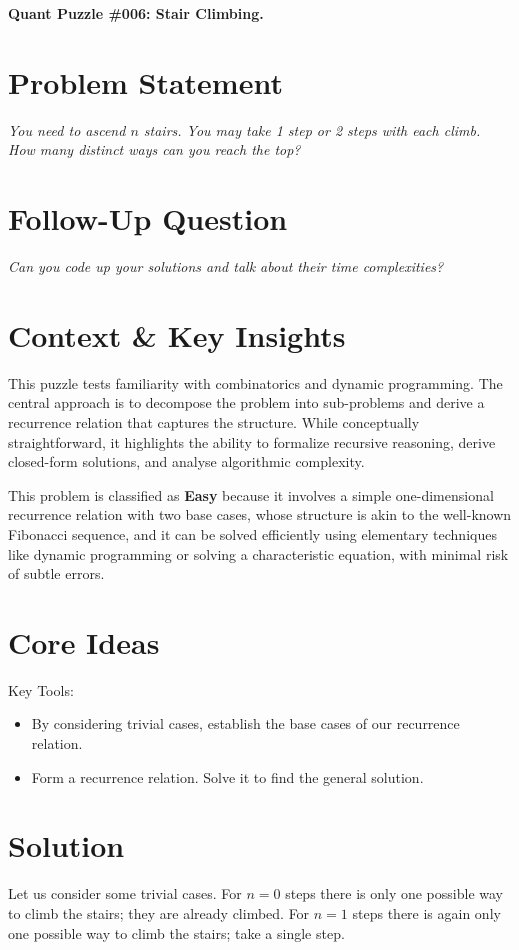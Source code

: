 \documentclass[12pt]{article}
\begin{document}
\begin{center}
    \Large \textbf{Quant Puzzle \#006: Stair Climbing.}
\end{center}

\section*{Problem Statement}
\textit{You need to ascend $n$ stairs. You may take 1 step or 2 steps with each climb. How many distinct ways can you reach the top?}
\section*{Follow-Up Question}
\textit{Can you code up your solutions and talk about their time complexities?}

\bigskip

\section*{Context \& Key Insights}
This puzzle tests familiarity with combinatorics and dynamic programming. The central approach is to decompose the problem into sub-problems and derive a recurrence relation that captures the structure. While conceptually straightforward, it highlights the ability to formalize recursive reasoning, derive closed-form solutions, and analyse algorithmic complexity.

This problem is classified as \textbf{Easy} because it involves a simple one-dimensional recurrence relation with two base cases, whose structure is akin to the well-known Fibonacci sequence, and it can be solved efficiently using elementary techniques like dynamic programming or solving a characteristic equation, with minimal risk of subtle errors.

\section*{Core Ideas}
Key Tools:
\begin{itemize}
    \item By considering trivial cases, establish the base cases of our recurrence relation.
    \item Form a recurrence relation. Solve it to find the general solution.
\end{itemize}

\section*{Solution}
\noindent
Let us consider some trivial cases. For $n=0$ steps there is only one possible way to climb the stairs; they are already climbed. For $n=1$ steps there is again only one possible way to climb the stairs; take a single step.
\end{document}
